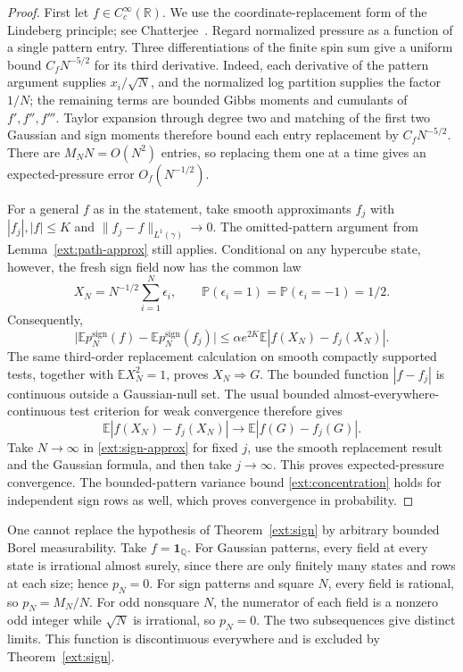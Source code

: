 \begin{proof}
First let $f\in C_c^\infty(\mathbb R)$. We use the coordinate-replacement
form of the Lindeberg principle; see
Chatterjee~\cite[Theorem~1.1]{chatterjee2006lindeberg}.
Regard normalized pressure as a
function of a single pattern entry. Three differentiations of the finite
spin sum give a uniform bound $C_fN^{-5/2}$ for its third derivative.
Indeed, each derivative of the pattern argument supplies
$x_i/\sqrt N$, and the normalized log partition supplies the factor
$1/N$; the remaining terms are bounded Gibbs moments and cumulants of
$f',f'',f'''$. Taylor expansion through degree two and matching of the
first two Gaussian and sign moments therefore bound each entry replacement
by $C_fN^{-5/2}$. There are $M_NN=O(N^2)$ entries, so replacing them one
at a time gives an expected-pressure error $O_f(N^{-1/2})$.

For a general $f$ as in the statement, take smooth approximants $f_j$ with
$|f_j|,|f|\le K$ and $\|f_j-f\|_{L^1(\gamma)}\to0$. The omitted-pattern
argument from Lemma~\ref{ext:path-approx} still applies. Conditional on
any hypercube state, however, the fresh sign field now has the common law
\[
 X_N=N^{-1/2}\sum_{i=1}^N\epsilon_i,
 \qquad \mathbb P(\epsilon_i=1)=\mathbb P(\epsilon_i=-1)=1/2.
\]
Consequently,
\begin{equation}\label{ext:sign-approx}
 \big|\mathbb E p_N^{\mathrm{sign}}(f)
       -\mathbb E p_N^{\mathrm{sign}}(f_j)\big|
 \le\alpha e^{2K}\mathbb E|f(X_N)-f_j(X_N)|.
\end{equation}
The same third-order replacement calculation on smooth compactly
supported tests, together with $\mathbb EX_N^2=1$, proves
$X_N\Rightarrow G$. The bounded function $|f-f_j|$ is continuous outside
a Gaussian-null set. The usual bounded almost-everywhere-continuous
test criterion for weak convergence therefore gives
\[
 \mathbb E|f(X_N)-f_j(X_N)|
 \longrightarrow\mathbb E|f(G)-f_j(G)|.
\]
Take $N\to\infty$ in \eqref{ext:sign-approx} for fixed $j$, use the smooth
replacement result and the Gaussian formula, and then take $j\to\infty$.
This proves expected-pressure convergence. The bounded-pattern variance
bound \eqref{ext:concentration} holds for independent sign rows as well,
which proves convergence in probability.
\end{proof}

\begin{remark}\label{ext:sign-scope}
One cannot replace the hypothesis of Theorem~\ref{ext:sign} by arbitrary
bounded Borel measurability. Take $f=\mathbf1_{\mathbb Q}$. For Gaussian
patterns, every field at every state is irrational almost surely, since
there are only finitely many states and rows at each size; hence $p_N=0$.
For sign patterns and square $N$, every field is rational, so
$p_N=M_N/N$. For odd nonsquare $N$, the numerator of each field is a
nonzero odd integer while $\sqrt N$ is irrational, so $p_N=0$.
The two subsequences give distinct limits. This function is discontinuous
everywhere and is excluded by Theorem~\ref{ext:sign}.
\end{remark}

